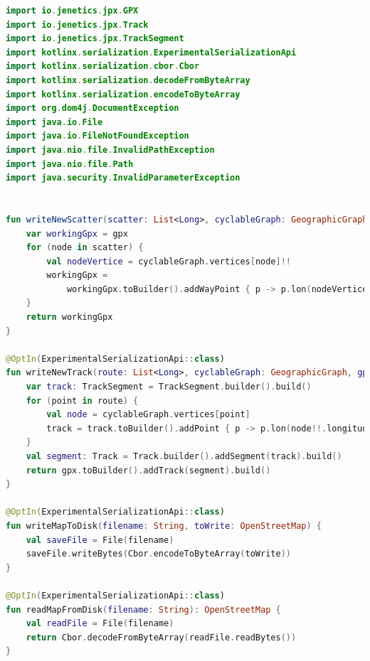 \documentclass[11pt,twoside,a4paper]{report}
\begin{document}
\begin{lstlisting}[language=kotlin]
import io.jenetics.jpx.GPX
import io.jenetics.jpx.Track
import io.jenetics.jpx.TrackSegment
import kotlinx.serialization.ExperimentalSerializationApi
import kotlinx.serialization.cbor.Cbor
import kotlinx.serialization.decodeFromByteArray
import kotlinx.serialization.encodeToByteArray
import org.dom4j.DocumentException
import java.io.File
import java.io.FileNotFoundException
import java.nio.file.InvalidPathException
import java.nio.file.Path
import java.security.InvalidParameterException


fun writeNewScatter(scatter: List<Long>, cyclableGraph: GeographicGraph, gpx: GPX): GPX {
    var workingGpx = gpx
    for (node in scatter) {
        val nodeVertice = cyclableGraph.vertices[node]!!
        workingGpx =
            workingGpx.toBuilder().addWayPoint { p -> p.lon(nodeVertice.longitude).lat(nodeVertice.latitude) }.build()
    }
    return workingGpx
}

@OptIn(ExperimentalSerializationApi::class)
fun writeNewTrack(route: List<Long>, cyclableGraph: GeographicGraph, gpx: GPX): GPX {
    var track: TrackSegment = TrackSegment.builder().build()
    for (point in route) {
        val node = cyclableGraph.vertices[point]
        track = track.toBuilder().addPoint { p -> p.lon(node!!.longitude).lat(node.latitude) }.build()
    }
    val segment: Track = Track.builder().addSegment(track).build()
    return gpx.toBuilder().addTrack(segment).build()
}

@OptIn(ExperimentalSerializationApi::class)
fun writeMapToDisk(filename: String, toWrite: OpenStreetMap) {
    val saveFile = File(filename)
    saveFile.writeBytes(Cbor.encodeToByteArray(toWrite))
}

@OptIn(ExperimentalSerializationApi::class)
fun readMapFromDisk(filename: String): OpenStreetMap {
    val readFile = File(filename)
    return Cbor.decodeFromByteArray(readFile.readBytes())
}


\end{lstlisting}
\end{document}
